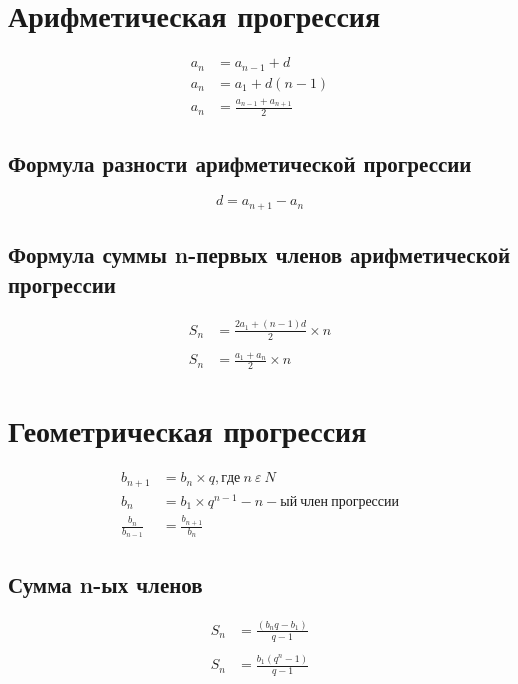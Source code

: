 \documentclass[a4paper,12pt]{article}
\begin{document}
\section{Арифметическая прогрессия}

\begin{align*}
a_{n} &= a_{n-1} + d \\
a_{n} &= a_{1} + d(n - 1) \\
a_{n} &= \frac{a_{n - 1} + a_{n + 1}}{2} 
\end{align*}

\subsection{Формула разности арифметической прогрессии}

\[ d = a_{n+1} - a_{n} \]

\subsection{Формула суммы n-первых членов арифметической прогрессии}

\begin{align*}
S_{n} &= \frac{2a_{1} + (n - 1)d}{2} \times n \\ \\
S_{n} &= \frac{a_{1} + a_{n}}{2} \times n
\end{align*}

\section{Геометрическая прогрессия}

\begin{align*}
b_{n+1} &= b_{n} \times q, где ~n ~\varepsilon ~N \\
b_{n} &= b_{1} \times q^{n-1} - n-ый ~член ~прогрессии \\
\frac{b_{n}}{b_{n - 1}} &= \frac{b_{n + 1}}{b_{n}}
\end{align*}

\subsection{Сумма n-ых членов}

\begin{align*}
S_{n} &= \frac{(b_{n}q - b_{1})}{q-1} \\ \\
S_{n} &= \frac{b_{1}(q^n - 1)}{q-1}
\end{align*}

\end{document}
